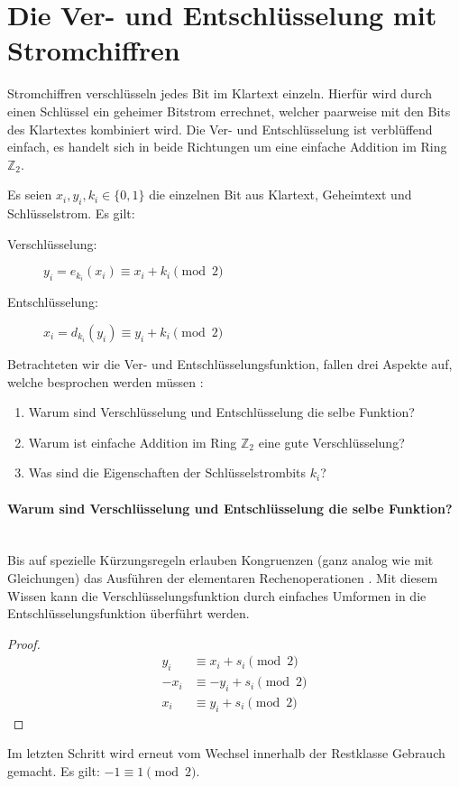 \section{Die Ver- und Entschlüsselung mit Stromchiffren}
Stromchiffren verschlüsseln jedes Bit im Klartext einzeln. Hierfür
wird durch einen Schlüs\-sel ein geheimer Bitstrom errechnet, welcher paarweise mit den Bits
des Klartextes kombiniert wird. Die Ver- und Entschlüsselung ist verblüffend einfach, es handelt
sich in beide Richtungen um eine einfache Addition im Ring $\mathbb{Z}_2$.

\begin{definition}
  Es seien $x_i,y_i,k_i \in \{0,1\}$ die einzelnen Bit aus Klartext, Geheimtext und Schlüs\-selstrom.
  Es gilt:
  \begin{description}
    \item[Verschlüsselung:] $y_i = e_{k_i}(x_i) \equiv x_i + k_i \pmod{2}$
    \item[Entschlüsselung:] $x_i = d_{k_i}(y_i) \equiv y_i + k_i \pmod{2}$
  \end{description}
\end{definition}

\noindent
Betrachteten wir die Ver- und Entschlüsselungsfunktion, fallen drei Aspekte auf, welche
besprochen werden müssen \parencite[31-34]{BOOK:crypto}:

\begin{enumerate}
  \item Warum sind Verschlüsselung und Entschlüsselung die selbe Funktion?
  \item Warum ist einfache Addition im Ring $\mathbb{Z}_2$ eine gute Verschlüsselung?
  \item Was sind die Eigenschaften der Schlüsselstrombits $k_i$?
\end{enumerate}

\paragraph{Warum sind Verschlüsselung und Entschlüsselung die selbe Funktion?}\mbox{}\\
Bis auf spezielle Kürzungsregeln erlauben Kongruenzen (ganz analog wie mit Gleichungen)
das Ausführen der elementaren Rechenoperationen \parencite[181-183]{BOOK:numberTheory}.
Mit diesem Wissen kann die Verschlüsselungsfunktion durch einfaches Umformen in die
Entschlüsselungsfunktion überführt werden.
\begin{proof}
  \begin{align*}
    y_i  & \equiv x_i + s_i \pmod{2}  \\
    -x_i & \equiv -y_i + s_i \pmod{2} \\
    x_i  & \equiv y_i + s_i \pmod{2}
  \end{align*}
\end{proof}
\noindent
Im letzten Schritt wird erneut vom Wechsel innerhalb der Restklasse Gebrauch gemacht.
Es gilt: $-1 \equiv 1 \pmod{2}$.

